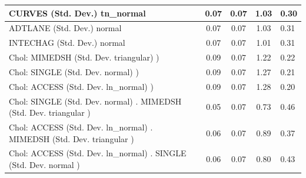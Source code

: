 \begin{table}
\begin{center}
\begin{tabular}{|l|l|c|c|c|l|}
			\hline
			CURVES (Std. Dev.) tn_normal &  & 0.07 & 0.07 & 1.03 & 0.30 \\
			\hline
			ADTLANE (Std. Dev.) normal &  & 0.07 & 0.07 & 1.03 & 0.31 \\
			\hline
			INTECHAG (Std. Dev.) normal &  & 0.07 & 0.07 & 1.01 & 0.31 \\
			\hline
			 Chol: MIMEDSH (Std. Dev. triangular) ) &  & 0.09 & 0.07 & 1.22 & 0.22 \\
			\hline
			 Chol: SINGLE (Std. Dev. normal) ) &  & 0.09 & 0.07 & 1.27 & 0.21 \\
			\hline
			 Chol: ACCESS (Std. Dev. ln_normal) ) &  & 0.09 & 0.07 & 1.28 & 0.20 \\
			\hline
			 Chol: SINGLE (Std. Dev. normal) . MIMEDSH (Std. Dev.   triangular ) &  & 0.05 & 0.07 & 0.73 & 0.46 \\
			\hline
			 Chol: ACCESS (Std. Dev. ln_normal) . MIMEDSH (Std. Dev.   triangular ) &  & 0.06 & 0.07 & 0.89 & 0.37 \\
			\hline
			 Chol: ACCESS (Std. Dev. ln_normal) . SINGLE (Std. Dev.   normal ) &  & 0.06 & 0.07 & 0.80 & 0.43 \\
			\hline
		\end{tabular}
	\end{center}
\end{table}